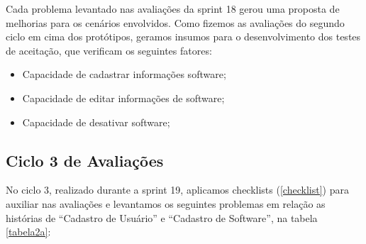 Cada problema levantado nas avaliações  da sprint 18 gerou uma proposta de melhorias para os cenários envolvidos. Como fizemos as avaliações do segundo ciclo em cima dos protótipos, geramos insumos para o desenvolvimento dos testes de aceitação, que verificam os seguintes fatores:

\begin{itemize}
	\item Capacidade de cadastrar informações software;
	\item Capacidade de editar informações de software;
	\item Capacidade de desativar software;
\end{itemize}

\subsection{Ciclo 3 de Avaliações}

No ciclo 3, realizado durante a sprint 19, aplicamos checklists (\ref{checklist}) para auxiliar nas avaliações e levantamos os seguintes problemas em relação as histórias de ``Cadastro de Usuário'' e ``Cadastro de Software'', na tabela \ref{tabela2a}:

